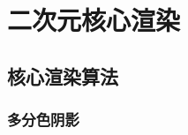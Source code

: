 \documentclass[twoside, 11pt, a4paper]{article}
\begin{document}


\section{二次元核心渲染}

\subsection{核心渲染算法}

    
    

    

\subsubsection{多分色阴影}

{%

}
\end{document}
